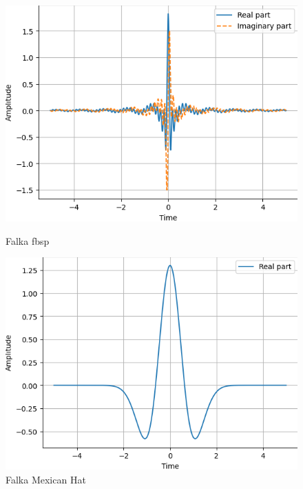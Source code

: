 \begin{figure}[ht]
    \centering
    \begin{minipage}[t]{0.3\linewidth}
        \includegraphics[width=\linewidth]{Rozdziały/02.Podstawy_teoretyczne/Obrazy/wavelet_fbsp1-1.5-1.0.png}
        \caption{Falka fbsp}
        \label{fig:image31}
    \end{minipage}
    \hspace{0.5cm}
    \begin{minipage}[t]{0.3\linewidth}
        \includegraphics[width=\linewidth]{Rozdziały/02.Podstawy_teoretyczne/Obrazy/wavelet_mexh.png}
        \caption{Falka Mexican Hat}
        \label{fig:image32}
    \end{minipage}
    \hspace{0.5cm}

\end{figure}
